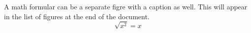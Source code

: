 A math formular can be a separate figre with a caption as well. This will appear in the list of figures at the end of the document.
\begin{equation}
 \sqrt{x^2}=x 
\end{equation} 


